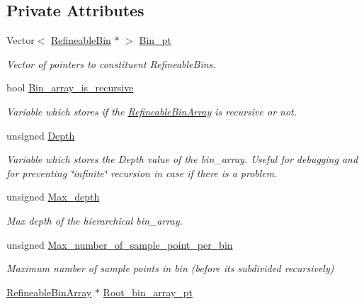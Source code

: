 \subsection*{Private Attributes}
\begin{DoxyCompactItemize}
\item 
Vector$<$ \hyperlink{classRefineableBin}{Refineable\+Bin} $\ast$ $>$ \hyperlink{classRefineableBinArray_a164db8709f15119c8c5a761e9715d1a4}{Bin\+\_\+pt}
\begin{DoxyCompactList}\small\item\em Vector of pointers to constituent Refineable\+Bins. \end{DoxyCompactList}\item 
bool \hyperlink{classRefineableBinArray_af36bed0c24cd70af160db504a3160d0b}{Bin\+\_\+array\+\_\+is\+\_\+recursive}
\begin{DoxyCompactList}\small\item\em Variable which stores if the \hyperlink{classRefineableBinArray}{Refineable\+Bin\+Array} is recursive or not. \end{DoxyCompactList}\item 
unsigned \hyperlink{classRefineableBinArray_a5ecc65773101eced0ff7afe57fe04804}{Depth}
\begin{DoxyCompactList}\small\item\em Variable which stores the Depth value of the bin\+\_\+array. Useful for debugging and for preventing \char`\"{}infinite\char`\"{} recursion in case if there is a problem. \end{DoxyCompactList}\item 
unsigned \hyperlink{classRefineableBinArray_a234ea22c1be2373c08ee64721735d898}{Max\+\_\+depth}
\begin{DoxyCompactList}\small\item\em Max depth of the hierarchical bin\+\_\+array. \end{DoxyCompactList}\item 
unsigned \hyperlink{classRefineableBinArray_a6841cb84bc34762a8b192db60393a98a}{Max\+\_\+number\+\_\+of\+\_\+sample\+\_\+point\+\_\+per\+\_\+bin}
\begin{DoxyCompactList}\small\item\em Maximum number of sample points in bin (before it\textquotesingle{}s subdivided recursively) \end{DoxyCompactList}\item 
\hyperlink{classRefineableBinArray}{Refineable\+Bin\+Array} $\ast$ \hyperlink{classRefineableBinArray_a5b75f5d76558759afe6ebae878f35f50}{Root\+\_\+bin\+\_\+array\+\_\+pt}

\end{DoxyCompactItemize}
